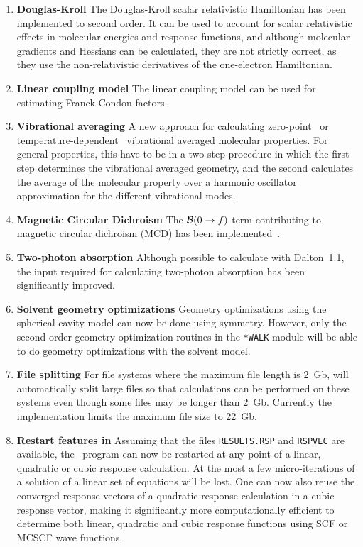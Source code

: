 \begin{enumerate}
\item {\bf Douglas-Kroll} The Douglas-Kroll scalar relativistic Hamiltonian
has been implemented to second order. It can be used to account for
scalar relativistic effects in molecular energies and response
functions, and although molecular gradients and Hessians can be
calculated, they are not strictly correct, as they use the
non-relativistic derivatives of the one-electron Hamiltonian.

\item {\bf Linear coupling model} The linear coupling model can be used for
estimating Franck-Condon factors.

\item  {\bf Vibrational averaging} A new approach for calculating
zero-point~\cite{poakrprtjcp112,krpoaprtjcp112} or
tem\-pera\-ture-dependent~\cite{krjljv} vibrational averaged molecular
properties. For general properties, this have to be in a two-step
procedure in which the first step determines the vibrational averaged
geometry, and the second calculates the average of the molecular
property over a harmonic oscillator approximation for the different
vibrational modes.

\item {\bf Magnetic Circular Dichroism} The ${\cal{B}}(0\rightarrow f)$ term
contributing to
magnetic circular dichroism (MCD) has been
implemented~\cite{Coriani:MCDRSP}.

\item {\bf Two-photon absorption} Although possible to calculate with
Dalton~1.1, the input required for calculating two-photon absorption
has been significantly improved.

\item{\bf Solvent geometry optimizations} Geometry optimizations using
the spherical cavity model can now be done using symmetry. However,
only the second-order geometry optimization routines in the
\verb|*WALK| module will be able to do geometry optimizations with the
solvent model.

\item {\bf File splitting} For file systems where the maximum file length is
2~Gb, {\dalton} will automatically split large files  so that
calculations can be performed on these systems even though some files
may be longer than 2~Gb. Currently the implementation limits the
maximum file size to 22~Gb.

\item {\bf Restart features in \resp } Assuming that the files
\verb|RESULTS.RSP| and \verb|RSPVEC| are available, the \resp\ program
can now be restarted at any point of a linear, quadratic or cubic
response calculation. At the most a few micro-iterations of a solution
of a linear set of equations will be lost. One can now also reuse the
converged response vectors of a quadratic response calculation in a
cubic response vector, making it significantly more computationally
efficient to determine both linear, quadratic and cubic response
functions using SCF or MCSCF wave functions.
\end{enumerate}
